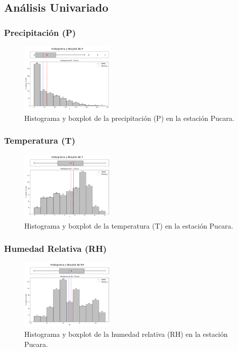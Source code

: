 \subsection{Análisis Univariado}

\subsubsection*{Precipitación (P)}
\begin{figure}[H]
\centering
\includegraphics[width=0.4\textwidth]{resultados/por_estacion_meteorologica/Pucara/P_histograma.png}
\caption{Histograma y boxplot de la precipitación (P) en la estación Pucara.}
\label{fig:pucara_P}
\end{figure}

\subsubsection*{Temperatura (T)}
\begin{figure}[H]
\centering
\includegraphics[width=0.4\textwidth]{resultados/por_estacion_meteorologica/Pucara/T_histograma.png}
\caption{Histograma y boxplot de la temperatura (T) en la estación Pucara.}
\label{fig:pucara_T}
\end{figure}

\subsubsection*{Humedad Relativa (RH)}
\begin{figure}[H]
\centering
\includegraphics[width=0.4\textwidth]{resultados/por_estacion_meteorologica/Pucara/RH_histograma.png}
\caption{Histograma y boxplot de la humedad relativa (RH) en la estación Pucara.}
\label{fig:pucara_RH}
\end{figure}

